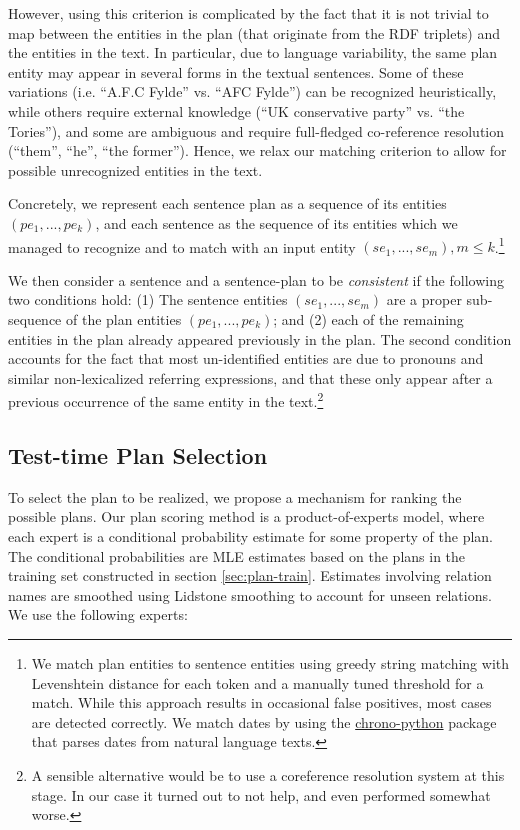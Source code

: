 \documentclass[11pt,a4paper]{article}
\begin{document}
However, using this criterion is complicated by the fact that it is not trivial to map between the entities in the plan (that originate from the RDF triplets) and the entities in the text. In particular, due to language variability, the same plan entity may appear in several forms in the textual sentences. Some of these variations (i.e. ``A.F.C Fylde'' vs.  ``AFC Fylde'') can be recognized heuristically, while others require external knowledge (``UK conservative party'' vs. ``the Tories''), and some are ambiguous and require full-fledged co-reference resolution (``them'', ``he'', ``the former''). Hence, we relax our matching criterion to allow for possible unrecognized entities in the text.

Concretely, we represent each sentence plan as a sequence of its entities $(pe_1, ..., pe_k)$, and each sentence as the sequence of its entities which we managed to recognize and to match with an input entity $(se_1,...,se_m), m \leq k$.\footnote{We match plan entities to sentence entities using greedy string matching with Levenshtein distance   \cite{levenshtein1966binary} for each token and a manually tuned threshold for a match. 
While this approach results in occasional false positives, most cases are detected correctly. We match dates by using the 
\hyperlink{https://github.com/wanasit/chrono-python}{chrono-python} package that parses dates from natural language texts.}

We then consider a sentence and a sentence-plan to be \emph{consistent} if the following two conditions hold:
(1) The sentence entities $(se_1, ..., se_m)$ are a proper sub-sequence of the plan entities $(pe_1, ..., pe_k)$; and (2) each of the remaining entities in the plan already appeared previously in the plan. The second condition accounts for the fact that most un-identified entities are due to pronouns and similar non-lexicalized referring expressions, and that these only appear after a previous occurrence of the same entity in the text.\footnote{A sensible alternative would be to use a coreference resolution system at this stage. In our case it turned out to not help, and even performed somewhat worse.}

\subsection{Test-time Plan Selection}\label{sec:plan-ranking}

To select the plan to be realized, we propose a mechanism for ranking the possible plans. Our plan scoring method is a product-of-experts model, where each expert is a conditional probability estimate for some property of the plan. The conditional probabilities are MLE estimates based on the plans in the training set constructed in section \ref{sec:plan-train}. Estimates involving relation names are smoothed using Lidstone smoothing to account for unseen relations.
We use the following experts:
\end{document}
